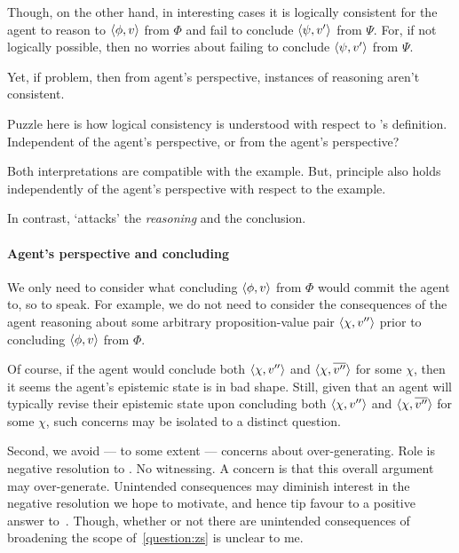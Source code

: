 \begin{note}
  Though, on the other hand, in interesting cases it is logically consistent for the agent to reason to \(\langle \phi, v \rangle\) from \(\Phi\) and fail to conclude \(\langle \psi, v' \rangle\) from \(\Psi\).
  For, if not logically possible, then no worries about failing to conclude \(\langle \psi, v' \rangle\) from \(\Psi\).

  Yet, if problem, then from agent's perspective, instances of reasoning aren't consistent.

  Puzzle here is how logical consistency is understood with respect to \citeauthor{Pollock:1987un}'s definition.
  Independent of the agent's perspective, or from the agent's perspective?

  Both interpretations are compatible with the example.
  But, principle also holds independently of the agent's perspective with respect to the example.
\end{note}

\begin{note}
  In contrast, \requ{} `attacks' the \emph{reasoning} and the conclusion.
\end{note}

\paragraph{Agent's perspective and concluding}

\begin{note}
  We only need to consider what concluding \(\langle \phi, v \rangle\) from \(\Phi\) would commit the agent to, so to speak.
  For example, we do not need to consider the consequences of the agent reasoning about some arbitrary proposition-value pair \(\langle \chi, v'' \rangle\) prior to concluding \(\langle \phi, v \rangle\) from \(\Phi\).

  Of course, if the agent would conclude both \(\langle \chi, v'' \rangle\) and \(\langle \chi, \overline{v''} \rangle\) for some \(\chi\), then it seems the agent's epistemic state is in bad shape.
  Still, given that an agent will typically revise their epistemic state upon concluding both \(\langle \chi, v'' \rangle\) and \(\langle \chi, \overline{v''} \rangle\) for some \(\chi\), such concerns may be isolated to a distinct question.

  Second, we avoid --- to some extent --- concerns about over-generating.
  Role is negative resolution to \issueConstraint{}.
  No witnessing.
  A concern is that this overall argument may over-generate.
  Unintended consequences may diminish interest in the negative resolution we hope to motivate, and hence tip favour to a positive answer to~\issueConstraint{}.
  Though, whether or not there are unintended consequences of broadening the scope of~\autoref{question:zs} is unclear to me.
\end{note}

